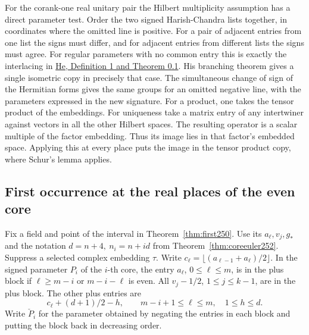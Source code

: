 \documentclass[a4paper,11pt]{article}
\theoremstyle{definition}
\theoremstyle{remark}
\numberwithin{equation}{section}
\begin{document}
For the corank-one real unitary pair the Hilbert multiplicity
assumption has a direct parameter test. Order the two signed
Harish-Chandra lists together, in coordinates where the omitted
line is positive. For a pair of adjacent entries from one list the
signs must differ, and for adjacent entries from different lists
the signs must agree. For regular parameters with no common entry
this is exactly the interlacing in \href{https://arxiv.org/abs/1508.02032}{He,
Definition 1 and Theorem 0.1}. His branching theorem gives a single
isometric copy in precisely that case. The simultaneous change of
sign of the Hermitian forms gives the same groups for an omitted
negative line, with the parameters expressed in the new signature.
For a product, one takes the tensor product of the embeddings.
For uniqueness take a matrix entry of any
intertwiner against vectors in all the other Hilbert spaces. The resulting
operator is a scalar multiple of the factor embedding. Thus its image lies in that
factor's embedded space. Applying this at every place puts the image
in the tensor product copy, where Schur's lemma applies.

\subsection{First occurrence at the real places of the even core}\label{nav:VIII-38}
Fix a field and point of the interval in Theorem~\ref{thm:first250}.
Use its \(a_\ell,v_j,g_*\) and the notation \(d=n+4,\ n_i=n+i d\)
from Theorem~\ref{thm:coreeuler252}. Suppress a selected complex
embedding \(\tau\). Write \(c_\ell=\lfloor(a_{\ell-1}+a_\ell)/2\rfloor\).
In the signed parameter \(P_i\) of the \(i\)-th core, the entry
\(a_\ell\), \(0\le\ell\le m\), is in the plus block if
\(\ell\ge m-i\) or \(m-i-\ell\) is even. All \(v_j-1/2\),
\(1\le j\le k-1\), are in the plus block. The other plus entries are
\[
  c_\ell+(d+1)/2-h,\qquad
  m-i+1\le\ell\le m,\quad 1\le h\le d .
\]
Write \(\check P_i\) for the parameter obtained by negating the
entries in each block and putting the block back in decreasing order.
\end{document}
